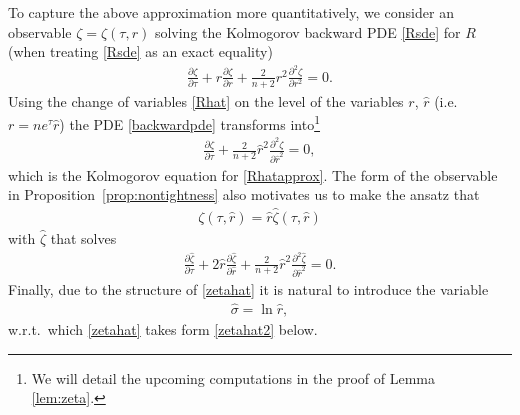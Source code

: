 \documentclass[english, letterpaper,12pt,reqno]{amsart}
\theoremstyle{remark}
\theoremstyle{plain}
\newcommand{\1}{\mathbf{1}}
\begin{document}
\noindent
To capture the above approximation more quantitatively, we consider an observable $\zeta=\zeta( \tau, r)$ solving the Kolmogorov backward PDE \eqref{Rsde} for $R$  (when treating \eqref{Rsde} as an exact equality)
%
\begin{align}\label{backwardpde}
	   \frac{\partial \zeta}{\partial \tau}+r \frac{\partial \zeta}{\partial r}+\frac{2 }{n+2}r^2\frac{\partial^2\zeta}{\partial  r^2}=0.
\end{align}
%
Using the change of variables \eqref{Rhat} on the level of the variables $ r $, $ \hat r $ (i.e.~$ r = n e^{ \tau } \hat r $) the PDE \eqref{backwardpde} transforms into\footnote{We will detail the upcoming computations in the proof of Lemma \ref{lem:zeta}.}
%
\begin{align}\label{backwardpde2}
    \frac{\partial \zeta}{\partial \tau}+\frac{2}{n+2}\hat r^2\frac{\partial^2\zeta}{\partial \hat r^2}=0,
\end{align}
%
which is the Kolmogorov equation for \eqref{Rhatapprox}. 
The form of the observable in Proposition~\ref{prop:nontightness} also motivates us to make the ansatz that
%
 \begin{align}
    \zeta(\tau,\hat r)=\hat r \hat 
\zeta(\tau,\hat r) \label{zetatohatzeta}
\end{align} 
%
with $\hat \zeta$ that solves 
%
\begin{align}\label{zetahat}
\frac{\partial \hat \zeta}{\partial \tau}+2\hat r\frac{\partial \hat \zeta}{\partial\hat r}+\frac{2}{n+2}\hat r^2 \frac{\partial^2 \hat \zeta}{\partial \hat r^2}=0.
\end{align} 
%
Finally, due to the structure of \eqref{zetahat} it is natural to introduce the variable
% 
\begin{align}\label{sigmahat}
    \hat \sigma = \ln \hat r ,
\end{align}
%
w.r.t.~which \eqref{zetahat} takes form \eqref{zetahat2} below.
\end{document}
